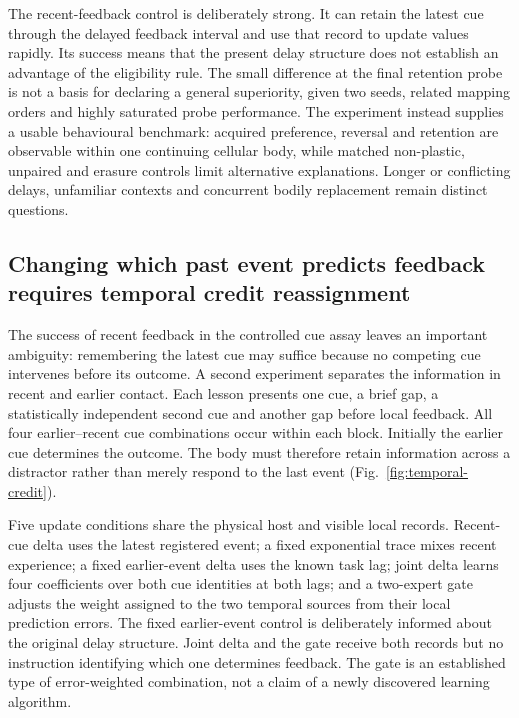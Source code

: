 The recent-feedback control is deliberately strong. It can retain the latest cue through the delayed feedback interval and use that record to update values rapidly. Its success means that the present delay structure does not establish an advantage of the eligibility rule. The small difference at the final retention probe is not a basis for declaring a general superiority, given two seeds, related mapping orders and highly saturated probe performance. The experiment instead supplies a usable behavioural benchmark: acquired preference, reversal and retention are observable within one continuing cellular body, while matched non-plastic, unpaired and erasure controls limit alternative explanations. Longer or conflicting delays, unfamiliar contexts and concurrent bodily replacement remain distinct questions.


\subsection*{Changing which past event predicts feedback requires temporal credit reassignment}

The success of recent feedback in the controlled cue assay leaves an important ambiguity: remembering the latest cue may suffice because no competing cue intervenes before its outcome. A second experiment separates the information in recent and earlier contact. Each lesson presents one cue, a brief gap, a statistically independent second cue and another gap before local feedback. All four earlier--recent cue combinations occur within each block. Initially the earlier cue determines the outcome. The body must therefore retain information across a distractor rather than merely respond to the last event (Fig.~\ref{fig:temporal-credit}).

Five update conditions share the physical host and visible local records. Recent-cue delta uses the latest registered event; a fixed exponential trace mixes recent experience; a fixed earlier-event delta uses the known task lag; joint delta learns four coefficients over both cue identities at both lags; and a two-expert gate adjusts the weight assigned to the two temporal sources from their local prediction errors. The fixed earlier-event control is deliberately informed about the original delay structure. Joint delta and the gate receive both records but no instruction identifying which one determines feedback. The gate is an established type of error-weighted combination, not a claim of a newly discovered learning algorithm.

